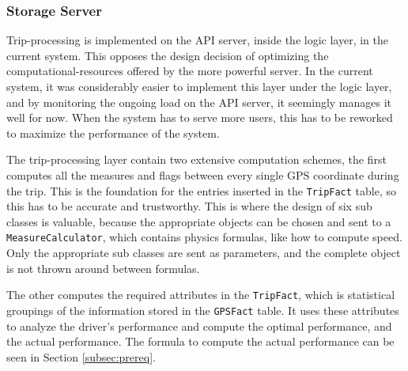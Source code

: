\subsubsection{Storage Server}\label{subsec:impl_storage_server}
Trip-processing is implemented on the API server, inside the logic layer, in the current system. This opposes the design decision of optimizing the computational-resources offered by the more powerful server. In the current system, it was considerably easier to implement this layer under the logic layer, and by monitoring the ongoing load on the API server, it seemingly manages it well for now. When the system has to serve more users, this has to be reworked to maximize the performance of the system. 

The trip-processing layer contain two extensive computation schemes, the first computes all the measures and flags between every single GPS coordinate during the trip. This is the foundation for the entries inserted in the \texttt{TripFact} table, so this has to be accurate and trustworthy. This is where the design of six sub classes is valuable, because the appropriate objects can be chosen and sent to a \texttt{MeasureCalculator}, which contains physics formulas, like how to compute speed. Only the appropriate sub classes are sent as parameters, and the complete object is not thrown around between formulas.

The other computes the required attributes in the \texttt{TripFact}, which is statistical groupings of the information stored in the \texttt{GPSFact} table. It uses these attributes to analyze the driver's performance and compute the optimal performance, and the actual performance. The formula to compute the actual performance can be seen in Section \ref{subsec:prereq}.